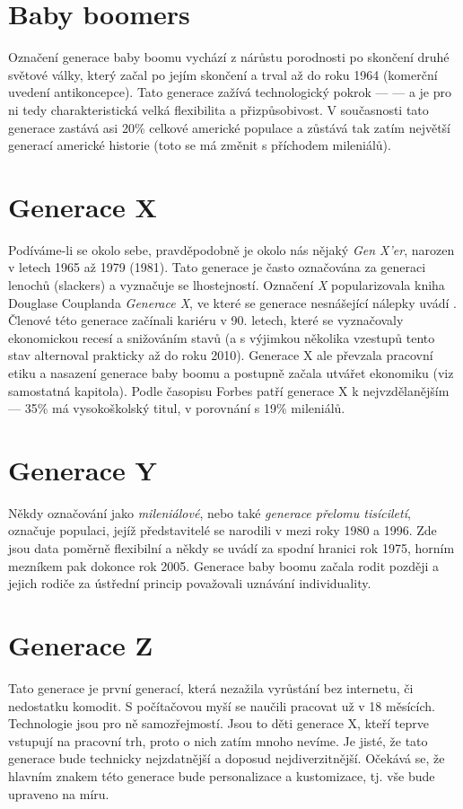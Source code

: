 \section{Baby boomers}\label{sec:baby-boomers}
Označení generace baby boomu vychází z nárůstu porodnosti po skončení druhé světové války, který začal po jejím skončení a trval až do roku 1964 (komerční uvedení antikoncepce).\cite{bergh2012coolznacky} Tato generace zažívá technologický pokrok --- --- a je pro ni tedy charakteristická velká flexibilita a přizpůsobivost.
V současnosti tato generace zastává asi 20\rm \% celkové americké populace a zůstává tak zatím největší generací americké historie\cite{investopedia2019babyboomers} (toto se má změnit s příchodem mileniálů).


\section{Generace X}\label{sec:generace-x}
Podíváme-li se okolo sebe, pravděpodobně je okolo nás nějaký \textit{Gen X'er}, narozen v letech 1965 až 1979 (1981). Tato generace je často označována za generaci lenochů (slackers) a vyznačuje se lhostejností. Označení \textit{X} popularizovala kniha Douglase Couplanda \textit{Generace X}, ve které se generace nesnášející nálepky uvádí .\cite{bergh2012coolznacky}
Členové této generace začínali kariéru v 90. letech, které se vyznačovaly ekonomickou recesí a snižováním stavů (a s výjimkou několika vzestupů tento stav alternoval prakticky až do roku 2010\cite{kotler2009chaotika}). Generace X ale převzala pracovní etiku a nasazení generace baby boomu a postupně začala utvářet ekonomiku (viz samostatná kapitola). Podle časopisu Forbes patří generace X k nejvzdělanějším --- 35\rm \% má vysokoškolský titul, v porovnání s 19\rm \% mileniálů.\cite{forbes2019generationX}


\section{Generace Y}\label{sec:generace-y}
Někdy označování jako \textit{mileniálové}, nebo také \textit{generace přelomu tisíciletí}, označuje populaci, jejíž představitelé se narodili v mezi roky 1980 a 1996. Zde jsou data poměrně flexibilní a někdy se uvádí za spodní hranici rok 1975, horním mezníkem pak dokonce rok 2005.\cite{rezlerova2007generacey} Generace baby boomu začala rodit později a jejich rodiče za ústřední princip považovali uznávání individuality.\cite{bergh2012coolznacky}

\section{Generace Z}\label{sec:generace-z}
Tato generace je první generací, která nezažila vyrůstání bez internetu, či nedostatku komodit. S počítačovou myší se naučili pracovat už v 18 měsících.\cite{bergh2012coolznacky} Technologie jsou pro ně samozřejmostí.
Jsou to děti generace X, kteří teprve vstupují na pracovní trh, proto o nich zatím mnoho nevíme. Je jisté, že tato generace bude technicky nejzdatnější a doposud nejdiverzitnější. Očekává se, že hlavním znakem této generace bude personalizace a kustomizace, tj. vše bude upraveno na míru.

